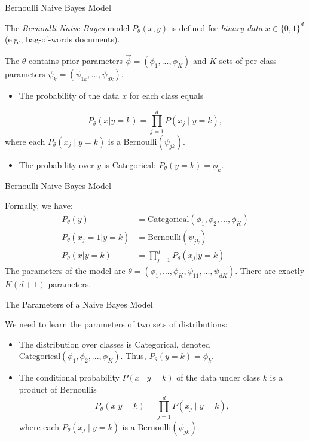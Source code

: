\documentclass[../../main.tex]{subfiles}
\begin{document}
\begin{frame}[fragile]{Bernoulli Naive Bayes Model}



The \textit{Bernoulli Naive Bayes} model $P_\theta(x,y)$ is defined for \textit{binary data} $x \in \{0,1\}^d$ (e.g., bag-of-words documents).

\vspace{0.2cm}


The $\theta$ contains prior parameters $\vec\phi = (\phi_1,...,\phi_K)$ and $K$ sets of per-class parameters $\psi_k = (\psi_{1k},...,\psi_{dk})$.

\vspace{0.2cm}

\begin{itemize}
    \item The probability of the data $x$ for each class equals
\end{itemize}
$$P_\theta(x|y=k) = \prod_{j=1}^d P(x_j \mid y=k),$$
where each $P_\theta(x_j \mid y=k)$ is a $\text{Bernoulli}(\psi_{jk})$.

\vspace{0.2cm}

\begin{itemize}
    \item The probability over $y$ is Categorical: $P_\theta(y=k) = \phi_k$.
\end{itemize}

\end{frame}

\begin{frame}[fragile]{Bernoulli Naive Bayes Model}

Formally, we have:
\begin{align*}
P_\theta(y) & = \text{Categorical}(\phi_1,\phi_2,\ldots,\phi_K) \\
P_\theta(x_j=1|y=k) & = \text{Bernoulli}(\psi_{jk}) \\
P_\theta(x|y=k) & = \prod_{j=1}^d P_\theta(x_j|y=k)
\end{align*}
The parameters of the model are $\theta = (\phi_1,...,\phi_K, \psi_{11}, ...,\psi_{dK})$.
There are exactly $K(d+1)$ parameters.
\end{frame}


\begin{frame}[fragile]{The Parameters of a Naive Bayes Model}

We need to learn the parameters of two sets of distributions:
 \begin{itemize}
     \item The distribution over classes is Categorical, denoted $\text{Categorical}(\phi_1, \phi_2, ..., \phi_K)$. Thus, $P_\theta(y=k) = \phi_k$.
     \item The conditional probability $P(x\mid y=k)$ of the data under class $k$ is a product of Bernoullis $$P_\theta(x|y=k) = \prod_{j=1}^d P(x_j \mid y=k),$$ where each $P_\theta(x_j \mid y=k)$ is a $\text{Bernoulli}(\psi_{jk})$.
 \end{itemize}
\end{frame}
\end{document}
